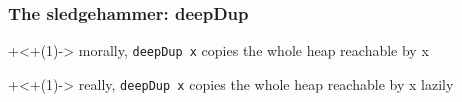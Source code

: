 \documentclass{beamer}
\newcommand{\hide}{\onslide+<+(1)->}
\begin{document}
\newcommand{\mdup}{\text{\textsf{dup}}}
\newcommand{\mdeepDup}{\text{\textsf{deepDup}}}
\newcommand{\sVar}{\text{Var}}
\newcommand{\sExp}{\text{Exp}}
\newcommand{\sHeap}{\text{Heap}}
\newcommand{\sVal}{\text{Val}}
\newcommand{\sValue}{\text{Value}}
\newcommand{\sEnv}{\text{Env}}
\newcommand{\sApp}[2]{\operatorname{#1}#2}
\newcommand{\sLam}[2]{\text{\textlambda} #1.\, #2}
\newcommand{\sDup}[1]{\sApp \mdup #1}
\newcommand{\sDeepDup}[1]{\sApp \mdeepDup #1}
\newcommand{\sLet}[2]{\text{\textsf{let}}\ #1\ \text{\textsf{in}}\ #2}
\newcommand{\sred}[4]{#1 : #2 \Downarrow #3 : #4}
\newcommand{\sRule}[1]{\text{{\textsc{#1}}}}
\newcommand{\fv}[1]{\text{fv}(#1)}
\newcommand{\ufv}[1]{\text{ufv}(#1)}
\newcommand{\ur}[2]{\text{ur}_{#1}(#2)}
\newcommand{\dom}[1]{\text{dom}\,#1}
\newcommand{\fresh}[1]{#1'}


\begin{frame}
\frametitle{The sledgehammer: deepDup}


\vfill
\begin{center}
\hide
morally, \lstinline-deepDup x- copies the whole heap reachable by x

\hide
\vfill
really, \lstinline-deepDup x- copies the whole heap reachable by x lazily
\end{center}

\end{frame}
\end{document}

